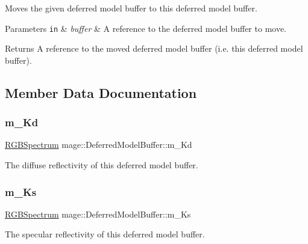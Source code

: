 Moves the given deferred model buffer to this deferred model buffer.


\begin{DoxyParams}[1]{Parameters}
\mbox{\tt in}  & {\em buffer} & A reference to the deferred model buffer to move. \\
\hline
\end{DoxyParams}
\begin{DoxyReturn}{Returns}
A reference to the moved deferred model buffer (i.\+e. this deferred model buffer). 
\end{DoxyReturn}


\subsection{Member Data Documentation}
\hypertarget{structmage_1_1_deferred_model_buffer_aea013f9eb8c80ef6e3f83702286a12fa}{}\label{structmage_1_1_deferred_model_buffer_aea013f9eb8c80ef6e3f83702286a12fa} 
\subsubsection{\texorpdfstring{m\+\_\+\+Kd}{m\_Kd}}
{\footnotesize\ttfamily \hyperlink{structmage_1_1_r_g_b_spectrum}{R\+G\+B\+Spectrum} mage\+::\+Deferred\+Model\+Buffer\+::m\+\_\+\+Kd}

The diffuse reflectivity of this deferred model buffer. \hypertarget{structmage_1_1_deferred_model_buffer_acff69877b5817d1d531cd9e1983e44d2}{}\label{structmage_1_1_deferred_model_buffer_acff69877b5817d1d531cd9e1983e44d2} 
\subsubsection{\texorpdfstring{m\+\_\+\+Ks}{m\_Ks}}
{\footnotesize\ttfamily \hyperlink{structmage_1_1_r_g_b_spectrum}{R\+G\+B\+Spectrum} mage\+::\+Deferred\+Model\+Buffer\+::m\+\_\+\+Ks}

The specular reflectivity of this deferred model buffer. \hypertarget{structmage_1_1_deferred_model_buffer_afbc02a46c53b9c3f6b2f7cd9149b918d}{}\label{structmage_1_1_deferred_model_buffer_afbc02a46c53b9c3f6b2f7cd9149b918d} 
